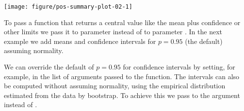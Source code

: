 \documentclass[krantz2]{krantz}\usepackage{knitr}%
\begin{document}
\begin{knitrout}\footnotesize
{}\color{fgcolor}\begin{kframe}
\begin{alltt}
\hlstd{(}  \hlstd{(}    \hlopt{+}
  \hlstd{(} \hlstd{=} \hlstd{)} \hlopt{+}
  \hlstd{(} \hlstd{=} \hlstd{,}  \hlstd{=} \hlstd{,}  \hlstd{=} \hlstd{,}  \hlstd{=} \hlstd{,}  \hlstd{=} \hlstd{)}
\end{alltt}
\end{kframe}

{\centering \texttt{[image: figure/pos-summary-plot-02-1]} 

}



\end{knitrout}

To pass a function that returns a central value like the mean plus confidence or other limits we pass it to parameter  instead of to parameter . In the next example we add means and confidence intervals for $p = 0.95$ (the default) assuming normality.

\begin{knitrout}\footnotesize
{}\color{fgcolor}\begin{kframe}
\begin{alltt}
  \hlstd{(} \hlstd{=} \hlstd{,}  \hlstd{=} \hlstd{,}  \hlstd{=} \hlstd{,}  \hlstd{=} \hlstd{)}
\end{alltt}
\end{kframe}
\end{knitrout}

We can override the default of $p = 0.95$ for confidence intervals by setting, for example,  in the list of arguments passed to the function. The intervals can also be computed without assuming normality, using the empirical distribution estimated from the data by bootstrap. To achieve this we pass to  the argument  instead of .
\end{document}
